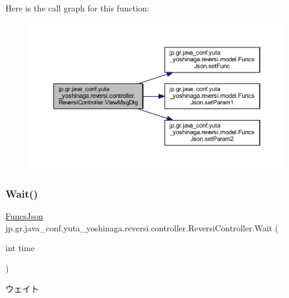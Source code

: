 Here is the call graph for this function\+:
\nopagebreak
\begin{figure}[H]
\begin{center}
\leavevmode
\includegraphics[width=350pt]{classjp_1_1gr_1_1java__conf_1_1yuta__yoshinaga_1_1reversi_1_1controller_1_1_reversi_controller_ac3cff78c16b0190fd744317a8c1a07d6_cgraph}
\end{center}
\end{figure}
\mbox{\label{classjp_1_1gr_1_1java__conf_1_1yuta__yoshinaga_1_1reversi_1_1controller_1_1_reversi_controller_a4f290c6bccc40ff5239ef8047bb644d8}} 
\subsubsection{\texorpdfstring{Wait()}{Wait()}}
{\footnotesize\ttfamily \hyperlink{classjp_1_1gr_1_1java__conf_1_1yuta__yoshinaga_1_1reversi_1_1model_1_1_funcs_json}{Funcs\+Json} jp.\+gr.\+java\+\_\+conf.\+yuta\+\_\+yoshinaga.\+reversi.\+controller.\+Reversi\+Controller.\+Wait (\begin{DoxyParamCaption}\item[{int}]{time }\end{DoxyParamCaption})}



ウェイト 



